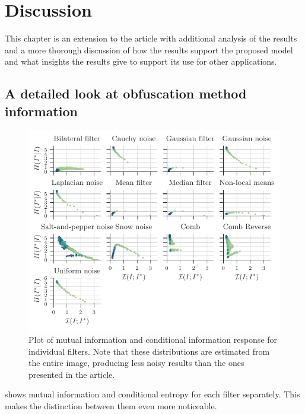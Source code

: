 \chapter{Discussion}
This chapter is an extension to the article with additional analysis of the results and a more thorough discussion of how the results support the proposed model and what insights the results give to support its use for other applications.

\section{A detailed look at obfuscation method information}
\begin{figure}
	\centering
	
	\includegraphics[width=1\textwidth]{figures/results/individual}
	
	\caption{Plot of mutual information and conditional information response for individual filters. Note that these distributions are estimated from the entire image, producing less noisy results than the ones presented in the article.}\label{fig:individual}
\end{figure}

 shows mutual information and conditional entropy for each filter separately. This makes the distinction between them even more noticeable. 

